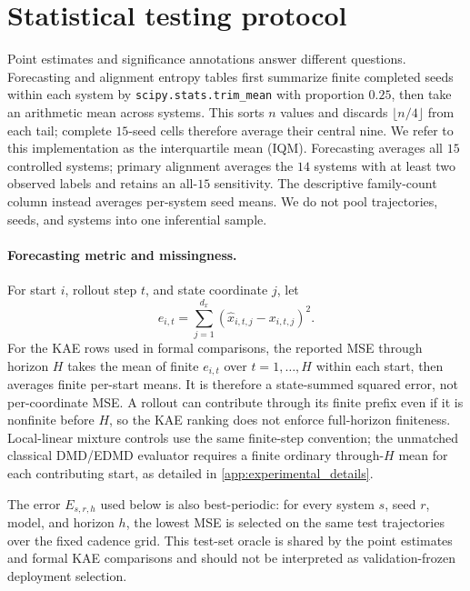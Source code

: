 \section{Statistical testing protocol}
\label{app:statistical_testing}

Point estimates and significance annotations answer different questions. Forecasting and alignment entropy tables first summarize finite completed seeds within each system by \texttt{scipy.stats.trim\_mean} with proportion \(0.25\), then take an arithmetic mean across systems. This sorts \(n\) values and discards \(\lfloor n/4\rfloor\) from each tail; complete \(15\)-seed cells therefore average their central nine. We refer to this implementation as the interquartile mean (IQM). Forecasting averages all \(15\) controlled systems; primary alignment averages the \(14\) systems with at least two observed labels and retains an all-\(15\) sensitivity. The descriptive family-count column instead averages per-system seed means. We do not pool trajectories, seeds, and systems into one inferential sample.

\paragraph{Forecasting metric and missingness.}
For start \(i\), rollout step \(t\), and state coordinate \(j\), let
\[
  e_{i,t}=\sum_{j=1}^{d_x}(\hat x_{i,t,j}-x_{i,t,j})^2.
\]
For the KAE rows used in formal comparisons, the reported MSE through horizon \(H\) takes the mean of finite \(e_{i,t}\) over \(t=1,\ldots,H\) within each start, then averages finite per-start means. It is therefore a state-summed squared error, not per-coordinate MSE. A rollout can contribute through its finite prefix even if it is nonfinite before \(H\), so the KAE ranking does not enforce full-horizon finiteness. Local-linear mixture controls use the same finite-step convention; the unmatched classical DMD/EDMD evaluator requires a finite ordinary through-\(H\) mean for each contributing start, as detailed in \cref{app:experimental_details}.

The error \(E_{s,r,h}\) used below is also best-periodic: for every system \(s\), seed \(r\), model, and horizon \(h\), the lowest MSE is selected on the same test trajectories over the fixed cadence grid. This test-set oracle is shared by the point estimates and formal KAE comparisons and should not be interpreted as validation-frozen deployment selection.


